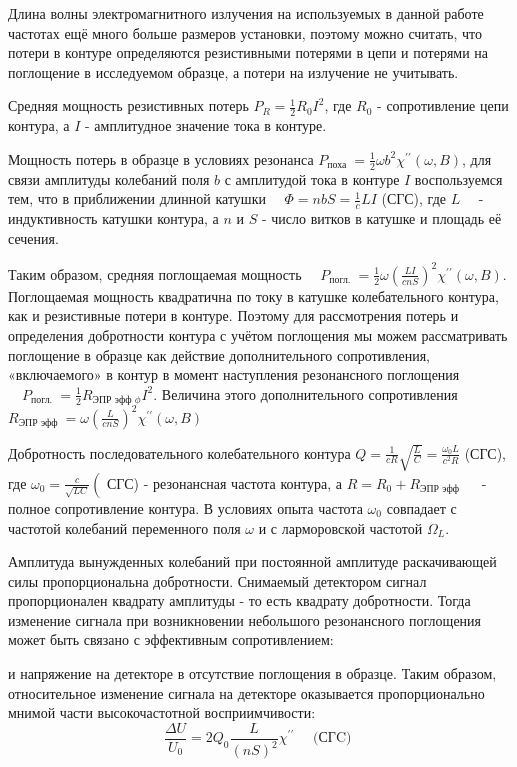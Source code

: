\documentclass[a4paper, 12pt]{article}%
\begin{document}
	Длина волны электромагнитного излучения на используемых в данной работе частотах ещё много больше размеров установки, поэтому можно считать, что потери в контуре определяются резистивными потерями в цепи и потерями на поглощение в исследуемом образце, а потери на излучение не учитывать.
	
	Средняя мощность резистивных потерь $P_R=\frac{1}{2} R_0 I^2$, где $R_0$ - сопротивление цепи контура, а $I$ - амплитудное значение тока в контуре.
	
	Мощность потерь в образце в условиях резонанса $P_{\text {поха }}=\frac{1}{2} \omega b^2 \chi^{\prime \prime}(\omega, B)$, для связи амплитуды колебаний поля $b$ с амплитудой тока в контуре $I$ воспользуемся тем, что в приближении длинной катушки $ \quad \Phi=n b S=\frac{1}{c} L I$ (СГС), где $L \quad$ - индуктивность катушки контура, а $n$ и $S$ - число витков в катушке и площадь её сечения.
	
	Таким образом, средняя поглощаемая мощность $\quad P_{\text {погл. }}=\frac{1}{2} \omega\left(\frac{L I}{c n S}\right)^2 \chi^{\prime \prime}(\omega, B)$. Поглощаемая мощность квадратична по току в катушке колебательного контура, как и резистивные потери в контуре. Поэтому для рассмотрения потерь и определения добротности контура с учётом поглощения мы можем рассматривать поглощение в образце как действие дополнительного сопротивления, «включаемого» в контур в момент наступления резонансного поглощения $\quad P_{\text {погл. }}=\frac{1}{2} R_{\text {ЭПР эфф } \phi} I^2$. Величина этого дополнительного сопротивления $R_{\text {ЭПР эфф }}=\omega\left(\frac{L}{c n S}\right)^2 \chi^{\prime \prime}(\omega, B)$
	
	Добротность последовательного колебательного контура $Q=\frac{1}{c R} \sqrt{\frac{L}{C}}=\frac{\omega_0 L}{c^2 R}$ (СГС), где $\omega_0=\frac{c}{\sqrt{L C}}\left(\right.$ СГС) - резонансная частота контура, а $R=R_0+R_{\text {ЭПР эфф }} \quad$ - полное сопротивление контура. В условиях опыта частота $\omega_0$ совпадает с частотой колебаний переменного поля $\omega$ и с ларморовской частотой $\Omega_L$.
	
	Амплитуда вынужденных колебаний при постоянной амплитуде раскачивающей силы пропорциональна добротности. Снимаемый детектором сигнал пропорционален квадрату амплитуды - то есть квадрату добротности. Тогда изменение сигнала при возникновении небольшого резонансного поглощения может быть связано с эффективным сопротивлением:
	
	и напряжение на детекторе в отсутствие поглощения в образце.
	Таким образом, относительное изменение сигнала на детекторе оказывается пропорционально мнимой части высокочастотной восприимчивости:
	$$
	\frac{\Delta U}{U_0}=2 Q_0 \frac{L}{(n S)^2} \chi^{\prime \prime} \quad \text { (СГC) }
	$$
	
\end{document}
